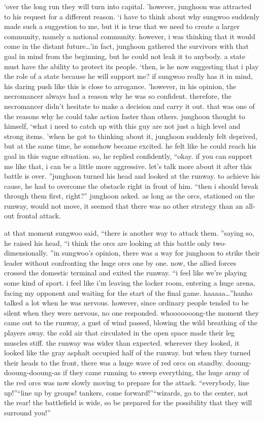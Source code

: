 ‘over the long run they will turn into capital.
’however, junghoon was attracted to his request for a different reason.
‘i have to think about why sungwoo suddenly made such a suggestion to me, but it is true that we need to create a larger community, namely a national community.
 however, i was thinking that it would come in the distant future…’in fact, junghoon gathered the survivors with that goal in mind from the beginning, but he could not leak it to anybody.
 a state must have the ability to protect its people.
‘then, is he now suggesting that i play the role of a state because he will support me? if sungwoo really has it in mind, his daring push like this is close to arrogance.
’however, in his opinion, the necromancer always had a reason why he was so confident.
therefore, the necromancer didn’t hesitate to make a decision and carry it out.
 that was one of the reasons why he could take action faster than others.
junghoon thought to himself, ‘what i need to catch up with this guy are not just a high level and strong items.
’when he got to thinking about it, junghoon suddenly felt deprived, but at the same time, he somehow became excited.
 he felt like he could reach his goal in this vague situation.
so, he replied confidently, “okay.
 if you can support me like that, i can be a little more aggressive.
 let’s talk more about it after this battle is over.
”junghoon turned his head and looked at the runway.
 to achieve his cause, he had to overcome the obstacle right in front of him.
“then i should break through them first, right?” junghoon asked.
as long as the orcs, stationed on the runway, would not move, it seemed that there was no other strategy than an all-out frontal attack.


at that moment sungwoo said, “there is another way to attack them.
”saying so, he raised his head, “i think the orcs are looking at this battle only two-dimensionally.
”in sungwoo’s opinion, there was a way for junghoon to strike their leader without confronting the huge orcs one by one.
now, the allied forces crossed the domestic terminal and exited the runway.
“i feel like we’re playing some kind of sport.
 i feel like i’m leaving the locker room, entering a huge arena, facing my opponent and waiting for the start of the final game.
 haaaaa…”hanho talked a lot when he was nervous.
 however, since ordinary people tended to be silent when they were nervous, no one responded.
whooooooong-the moment they came out to the runway, a gust of wind passed, blowing the wild breathing of the players away.
 the cold air that circulated in the open space made their leg muscles stiff.
the runway was wider than expected.
 wherever they looked, it looked like the gray asphalt occupied half of the runway.
 but when they turned their heads to the front, there was a huge wave of red orcs on standby.
dooung-dooung-dooung-as if they came running to sweep everything, the huge army of the red orcs was now slowly moving to prepare for the attack.
“everybody, line up!”“line up by groups! tankers, come forward!”“wizards, go to the center, not the rear! the battlefield is wide, so be prepared for the possibility that they will surround you!”

 